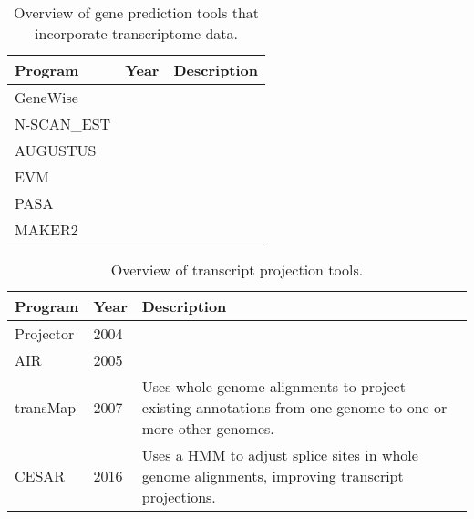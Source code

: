 \documentclass[fleqn,10pt]{wlscirep}
\begin{document}
\begin{table}[ht]
\centering
\begin{tabular}{|l|l|p{12cm}|}
\hline
Program & Year & Description \\
\hline
GeneWise & & \\
\hline
N-SCAN\_EST & & \\
\hline
AUGUSTUS & & \\
\hline
EVM & & \\
\hline
PASA & & \\
\hline
MAKER2 & & \\
\hline
\end{tabular}
\caption{\label{tab:history_prediction}Overview of gene prediction tools that incorporate transcriptome data.}
\end{table}

\begin{table}[ht]
\centering
\begin{tabular}{|l|l|p{12cm}|}
\hline
Program & Year & Description \\
\hline
Projector & 2004 \cite{meyer2004gene} & \\
\hline
AIR & 2005 \cite{florea2005gene} & \\
\hline
transMap & 2007 \cite{stanke2008using} & Uses whole genome alignments to project existing annotations from one genome to one or more other genomes. \\
\hline
CESAR & 2016 \cite{sharma2016coding} & Uses a HMM to adjust splice sites in whole genome alignments, improving transcript projections. \\
\hline
\end{tabular}
\caption{\label{tab:history_comparative}Overview of transcript projection tools.}
\end{table}
\end{document}
